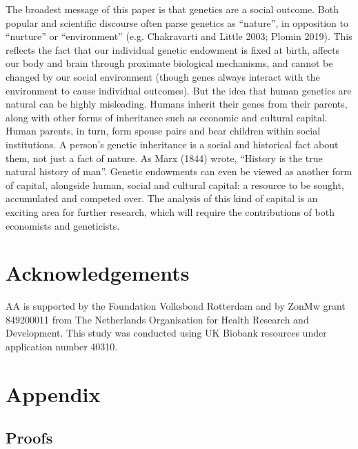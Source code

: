 \documentclass[
]{article}
\theoremstyle{definition}
\theoremstyle{definition}
\theoremstyle{definition}
\theoremstyle{definition}
\theoremstyle{remark}
\begin{document}
The broadest message of this paper is that genetics are a social
outcome. Both popular and scientific discourse often parse genetics as
``nature'', in opposition to ``nurture'' or ``environment'' (e.g. Chakravarti and Little 2003; Plomin 2019). This reflects the fact that
our individual genetic endowment is fixed at birth, affects our body and brain
through proximate biological mechanisms, and cannot be changed by our social
environment (though genes always interact with the environment to cause
individual outcomes). But the idea that human genetics are natural can be highly
misleading. Humans inherit their genes from their parents, along with other
forms of inheritance such as economic and cultural capital. Human parents, in
turn, form spouse pairs and bear children within social institutions. A person's
genetic inheritance is a social and historical fact about them, not just a
fact of nature. As Marx (1844) wrote, ``History is the true natural history of
man''. Genetic endowments can even be viewed as another form of capital,
alongside human, social and cultural capital: a resource to be sought,
accumulated and competed over. The analysis of this kind of capital is an
exciting area for further research, which will require the contributions of both
economists and geneticists.

\hypertarget{acknowledgements}{%
\section{Acknowledgements}\label{acknowledgements}}

AA is supported by the Foundation Volksbond Rotterdam and by ZonMw grant
849200011 from The Netherlands Organisation for Health Research and Development.
This study was conducted using UK Biobank resources under application number
40310.

\FloatBarrier

\newpage

\hypertarget{appendix}{%
\section{Appendix}\label{appendix}}

\localtableofcontents
\clearpage

\hypertarget{proofs}{%
\subsection{Proofs}\label{proofs}}
\end{document}
